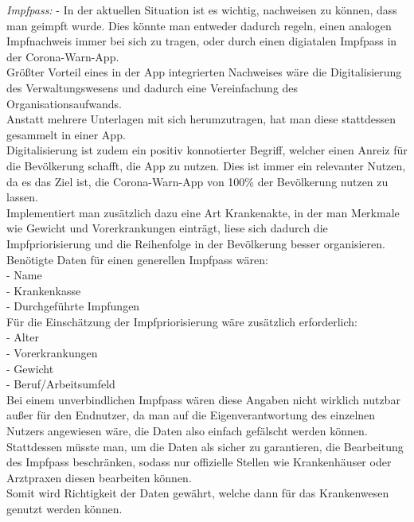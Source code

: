 \documentclass[conference]{IEEEtran}
\begin{document}
\textit{Impfpass:} - In der aktuellen Situation ist es wichtig, nachweisen zu können, dass man geimpft wurde. Dies könnte man entweder dadurch regeln, einen analogen Impfnachweis immer bei sich zu tragen, oder durch einen digiatalen Impfpass in der Corona-Warn-App.\\
Größter Vorteil eines in der App integrierten Nachweises wäre die Digitalisierung des Verwaltungswesens und dadurch eine Vereinfachung des Organisationsaufwands.\\ Anstatt mehrere Unterlagen mit sich herumzutragen, hat man diese stattdessen gesammelt in einer App.\\
Digitalisierung ist zudem ein positiv konnotierter Begriff, welcher einen Anreiz für die Bevölkerung schafft, die App zu nutzen. Dies ist immer ein relevanter Nutzen, da es das Ziel ist, die Corona-Warn-App von 100\% der Bevölkerung nutzen zu lassen. \\
Implementiert man zusätzlich dazu eine Art Krankenakte, in der man Merkmale wie Gewicht und Vorerkrankungen einträgt, liese sich dadurch die Impfpriorisierung und die Reihenfolge in der Bevölkerung besser organisieren.\\
Benötigte Daten für einen generellen Impfpass wären:\\
- Name \\
- Krankenkasse\\
- Durchgeführte Impfungen\\
Für die Einschätzung der Impfpriorisierung wäre zusätzlich erforderlich:\\
- Alter\\
- Vorerkrankungen \\
- Gewicht \\
- Beruf/Arbeitsumfeld\\
Bei einem unverbindlichen Impfpass wären diese Angaben nicht wirklich nutzbar außer für den Endnutzer, da man auf die Eigenverantwortung des einzelnen Nutzers angewiesen wäre, die Daten also einfach gefälscht werden können.\\
Stattdessen müsste man, um die Daten als sicher zu garantieren, die Bearbeitung des Impfpass beschränken, sodass nur offizielle Stellen wie Krankenhäuser oder Arztpraxen diesen bearbeiten können.\\
Somit wird Richtigkeit der Daten gewährt, welche dann für das Krankenwesen genutzt werden können.\\ \\
\end{document}
